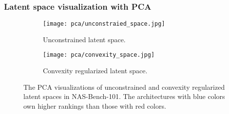 \documentclass[10pt,twocolumn,letterpaper]{article}
\begin{document}
\subsubsection{Latent space visualization with PCA}
\begin{figure}
	\centering
	\begin{subfigure}{0.499 \linewidth}
		\texttt{[image: pca/unconstraied\_space.jpg]}
		\caption{Unconstrained latent space.}
		\label{fig:pca-a}
		\end{subfigure}
	\hfill
		\begin{subfigure}{0.48 \linewidth}
		\texttt{[image: pca/convexity\_space.jpg]}
		\caption{Convexity regularized latent space.}
		\label{fig:pca-b}
	\end{subfigure}
	\caption{The PCA visualizations of unconstrained and convexity regularized latent spaces in NAS-Bench-101. The architectures with blue colors own higher rankings than those with red colors.}
	\label{fig:pca}
\end{figure} 
\end{document}
